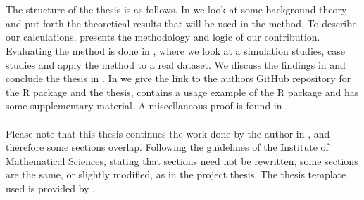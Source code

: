 \\
\\
The structure of the thesis is as follows. In  we look at some background theory and put forth the theoretical results that will be used in the method. To describe our calculations,  presents the methodology and logic of our contribution. Evaluating the method is done in , where we look at a simulation studies, case studies and apply the method to a real dataset. We discuss the findings in  and conclude the thesis in . In  we give the link to the authors GitHub repository for the R package and the thesis,  contains a usage example of the R package and  has some supplementary material. A miscellaneous proof is found in . 
\\
\\
Please note that this thesis continues the work done by the author in \citet{Arnstad:Relative_variable_importance_in_Bayesian_linear_mixed_models:2024}, and therefore some sections overlap. Following the guidelines of the Institute of Mathematical Sciences, stating that sections need not be rewritten, some sections are the same, or slightly modified, as in the project thesis. The thesis template used is provided by \citet{salvesen_template}.
